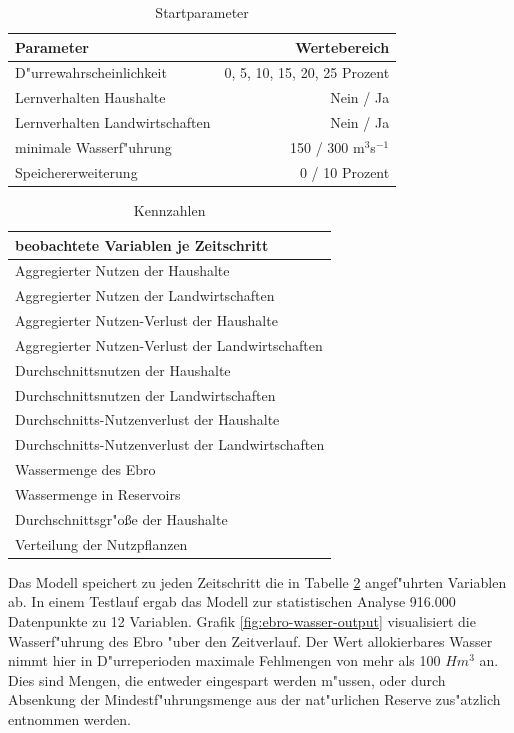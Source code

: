 \documentclass[11pt,a4paper]{article}
\begin{document}
\begin{table}[h]
\begin{tabular}{|l|r|}
\hline \textbf{Parameter} & \textbf{Wertebereich} \\
\hline D"urrewahrscheinlichkeit & 0, 5, 10, 15, 20, 25 Prozent  \\ 
\hline Lernverhalten Haushalte & Nein / Ja  \\ 
\hline Lernverhalten Landwirtschaften & Nein / Ja \\ 
\hline minimale Wasserf"uhrung & 150 / 300 m$^{3}$s$^{-1}$  \\ 
\hline Speichererweiterung & 0 / 10 Prozent \\ 
\hline 
\end{tabular} 
\caption{Startparameter}
\label{tab:input-parameters}
\end{table}
\newline
\newline
\begin{table}[h]
\begin{tabular}{|l|}
\hline \textbf{beobachtete Variablen je Zeitschritt} \\
\hline Aggregierter Nutzen der Haushalte \\ 
\hline Aggregierter Nutzen der Landwirtschaften  \\ 
\hline Aggregierter Nutzen-Verlust der Haushalte  \\ 
\hline Aggregierter Nutzen-Verlust der Landwirtschaften  \\ 
\hline Durchschnittsnutzen der Haushalte  \\ 
\hline Durchschnittsnutzen der Landwirtschaften  \\ 
\hline Durchschnitts-Nutzenverlust der Haushalte  \\ 
\hline Durchschnitts-Nutzenverlust der Landwirtschaften  \\ 
\hline Wassermenge des Ebro  \\ 
\hline Wassermenge in Reservoirs \\ 
\hline Durchschnittsgr"oße der Haushalte  \\ 
\hline Verteilung der Nutzpflanzen  \\ 
\hline 
\end{tabular} 
\caption{Kennzahlen}
\label{tab:output-variables}
\end{table}

Das Modell speichert zu jeden Zeitschritt die in Tabelle \ref{tab:output-variables} angef"uhrten Variablen ab. In einem Testlauf ergab das Modell zur statistischen Analyse 916.000 Datenpunkte zu 12 Variablen. Grafik \ref{fig:ebro-wasser-output} visualisiert die Wasserf"uhrung des Ebro "uber den Zeitverlauf. Der Wert allokierbares Wasser nimmt hier in D"urreperioden maximale Fehlmengen von mehr als 100 $Hm^{3}$ an. Dies sind Mengen, die entweder eingespart werden m"ussen, oder durch Absenkung der Mindestf"uhrungsmenge aus der nat"urlichen Reserve zus"atzlich entnommen werden.
\end{document}
